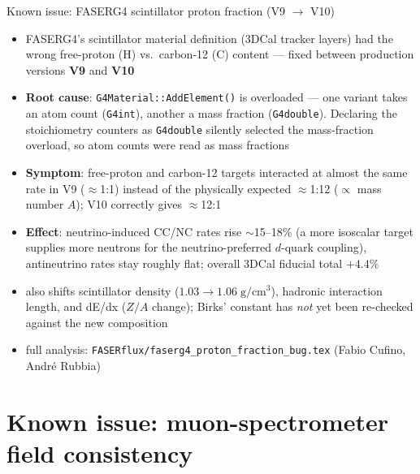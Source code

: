 \documentclass[aspectratio=169]{beamer}
\begin{document}
\begin{frame}{Known issue: FASERG4 scintillator proton fraction (V9
    $\to$ V10)}
  \footnotesize
  \begin{itemize}
    \item FASERG4's scintillator material definition (3DCal tracker
      layers) had the wrong free-proton (H) vs.\ carbon-12 (C) content ---
      fixed between production versions \textbf{V9} and \textbf{V10}
    \item \textbf{Root cause}: \texttt{G4Material::AddElement()} is
      overloaded --- one variant takes an atom count (\texttt{G4int}),
      another a mass fraction (\texttt{G4double}). Declaring the
      stoichiometry counters as \texttt{G4double} silently selected the
      mass-fraction overload, so atom counts were read as mass fractions
    \item \textbf{Symptom}: free-proton and carbon-12 targets interacted at
      almost the same rate in V9 ($\approx$1:1) instead of the physically
      expected $\approx$1:12 ($\propto$ mass number $A$); V10 correctly
      gives $\approx$12:1
    \item \textbf{Effect}: neutrino-induced CC/NC rates rise
      $\sim$15--18\% (a more isoscalar target supplies more neutrons for
      the neutrino-preferred $d$-quark coupling), antineutrino rates stay
      roughly flat; overall 3DCal fiducial total $+4.4\%$
    \item also shifts scintillator density ($1.03\to1.06\;\mathrm{g/cm^3}$),
      hadronic interaction length, and dE/dx ($Z/A$ change); Birks' constant
      has \emph{not} yet been re-checked against the new composition
    \item full analysis: \texttt{FASERflux/faserg4\_proton\_fraction\_bug.tex}
      (Fabio Cufino, Andr\'e Rubbia)
  \end{itemize}
\end{frame}

\section{Known issue: muon-spectrometer field consistency}
\end{document}
